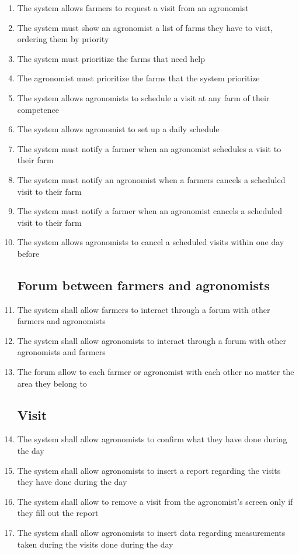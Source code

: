 \documentclass[10pt]{report}
\begin{document}
\begin{enumerate} [label=(R\arabic*), font=\itshape]
        \subsection*{Booking a visit}
        \item The system allows farmers to request a visit from an agronomist
        \item The system must show an agronomist a list of farms they have to visit, ordering them by priority
        \item The system must prioritize the farms that need help
        \item The agronomist must prioritize the farms that the system prioritize
        \item The system allows agronomists to schedule a visit at any farm of their competence
        \item The system allows agronomist to set up a daily schedule
        \item The system must notify a farmer when an agronomist schedules a visit to their farm
        \item The system must notify an agronomist when a farmers cancels a scheduled visit to their farm
        \item The system must notify a farmer when an agronomist cancels a scheduled visit to their farm
        \item The system allows agronomists to cancel a scheduled visits within one day before
        \subsection*{Forum between farmers and agronomists}
        \item The system shall allow farmers to interact through a forum with other farmers and agronomists
        \item The system shall allow agronomists to interact through a forum with other agronomists and farmers
        \item The forum allow to each farmer or agronomist with each other no matter the area they belong to 
        \subsection*{Visit}
        \item The system shall allow agronomists to confirm what they have done during the day
        \item The system shall allow agronomists to insert a report regarding the visits they have done during the day
        \item The system shall allow to remove a visit from the agronomist’s screen only if they fill out the report
        \item The system shall allow agronomists to insert data regarding measurements taken during the visits done during the day
    \end{enumerate}
\end{document}
